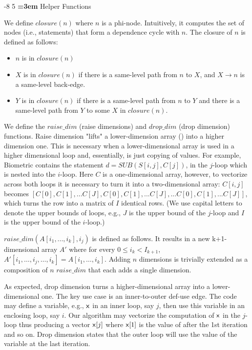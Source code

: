 \documentclass[sigconf, screen, natbib=false, dvipsnames, table]{acmart}
\makeatletter
\renewcommand{\subsection}{\@startsection{subsection}{2}{\z@}%
                        {-8\p@ \@plus -4\p@ \@minus -4\p@}%
                        {5\p@ \@plus 2\p@ \@minus 2\p@}%
                        {\normalfont\Large\bfseries\boldmath
                         \rightskip=\z@ \@plus 3em\pretolerance=10000 }}
\theoremstyle{definition}
\makeatother
\begin{document}
\subsection{Helper Functions}

We define $\mathit{closure}(n)$ where $n$ is a phi-node. Intuitively, it computes the set of nodes (i.e., statements) that form a dependence cycle with $n$.  The closure of $n$ is defined as follows:
\begin{itemize}
\item $n$ is in $\mathit{closure}(n)$
\item $X$ is in $\mathit{closure}(n)$ if there is a same-level path from $n$ to $X$, and $X \rightarrow n$ is a same-level back-edge.
\item $Y$ is in $\mathit{closure}(n)$ if there is a same-level path from $n$ to $Y$ and there is a same-level path from $Y$ to some $X$ in $\mathit{closure}(n)$.
\end{itemize}

We define the $\mathit{raise\_dim}$ (raise dimensions) and $\mathit{drop\_dim}$ (drop dimension) functions. Raise dimension "lifts" a lower-dimension array () into a higher dimension one. This is necessary when a lower-dimensional array is used in a higher dimensional loop and, essentially, is just copying of values. For example, Biometric contains the statement $d = \mathit{SUB}(S[i, j], C[j])$, in the $j$-loop which is nested into the $i$-loop. Here $C$ is a one-dimensional array, however, to vectorize across both loops it is necessary to turn it into a two-dimensional array: $C[i,j]$ becomes $[C[0],C[1],...C[J],C[0],C[1],...C[J], ... C[0],C[1],...C[J]]$, which turns the row into a matrix of $I$ identical rows. (We use capital letters to denote the upper bounds of loops, e.g., $J$ is the upper bound of the $j$-loop and $I$ is the upper bound of the $i$-loop.)

$\mathit{raise\_dim}(A[i_1,...,i_k],i_j)$ is defined as follows.  It results in a new {k+1}-dimensional array $A'$ where for every $0 \le i_{k} < I_{k+1}$, $A'[i_1, \ldots, i_j, \ldots, i_k] = A[i_1, \ldots, i_k]$. Adding $n$ dimensions is trivially extended as a composition of $n$ $\mathit{raise\_dim}$ that each adds a single dimension.

As expected, drop dimension turns a higher-dimensional array into a lower-dimensional one. The key use case is an inner-to-outer def-use edge. The code may define a variable, e.g., ${\sf {x}}$ in an inner loop, say $j$, then use this variable in an enclosing loop, say $i$. Our algorithm may vectorize the computation of ${\sf {x}}$ in the $j$-loop thus producing a vector ${\sf {x}}[j]$ where ${\sf {x}}[1]$ is the value of \x after the 1st iteration and so on. Drop dimension states that the outer loop will use the value of the variable at the last iteration.
\end{document}
